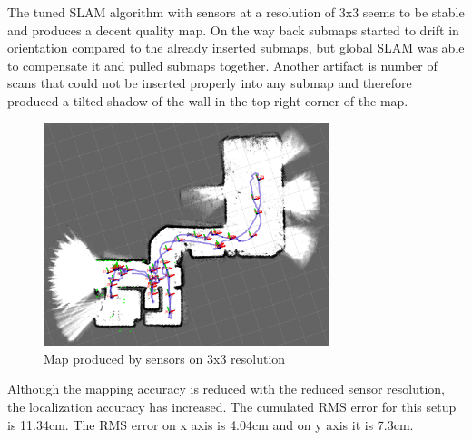 The tuned SLAM algorithm with sensors at a resolution of 3x3 seems to be stable and produces a 
decent quality map. On the way back submaps started to drift in orientation compared to the 
already inserted submaps, but global SLAM was able to compensate it and pulled submaps together.
Another artifact is number of scans that could not be inserted properly into any submap and 
therefore produced a tilted shadow of the wall in the top right corner of the map.

\begin{figure}[!h]
    \centering
	\includegraphics[height=65mm, keepaspectratio]{figures/03_map.png}
    \caption{Map produced by sensors on 3x3 resolution}
    \label{fig:03_map}
\end{figure}

Although the mapping accuracy is reduced with the reduced sensor resolution, the localization
accuracy has increased. The cumulated RMS error for this setup is 11.34cm. The RMS error on
x axis is 4.04cm and on y axis it is 7.3cm. 

